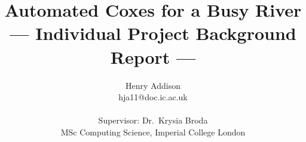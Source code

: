 \title{Automated Coxes for a Busy River\\\Large{--- Individual Project Background Report ---}}
\author{Henry Addison \\
       hja11@doc.ic.ac.uk\\ \\
       \small{Supervisor: Dr.\ Krysia Broda}\\
       \small{MSc Computing Science, Imperial College London}
}